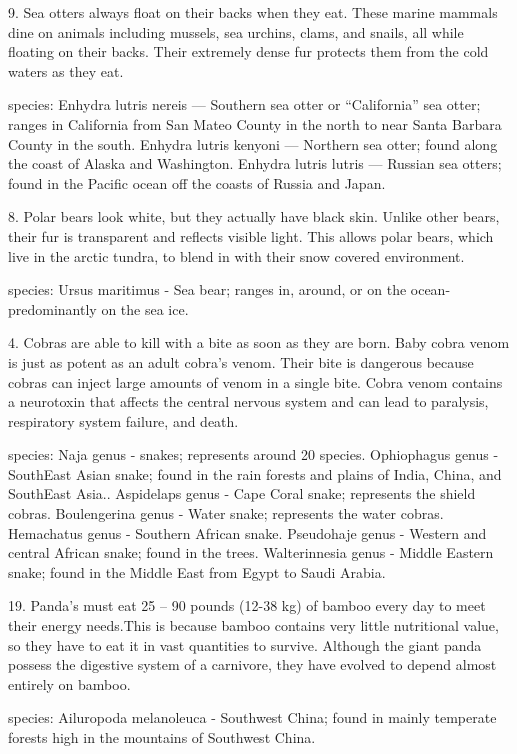 9. Sea otters always float on their backs when they eat. These marine mammals dine on animals including mussels, sea urchins, clams, and snails, all while floating on their backs. Their extremely dense fur protects them from the cold waters as they eat.

species:
Enhydra lutris nereis — Southern sea otter or “California” sea otter; ranges in California from San Mateo County in the north to near Santa Barbara County in the south.
Enhydra lutris kenyoni — Northern sea otter; found along the coast of Alaska and Washington.
Enhydra lutris lutris — Russian sea otters; found in the Pacific ocean off the coasts of Russia and Japan.

8. Polar bears look white, but they actually have black skin. Unlike other bears, their fur is transparent and reflects visible light. This allows polar bears, which live in the arctic tundra, to blend in with their snow covered environment.

species:
Ursus maritimus - Sea bear; ranges in, around, or on the ocean-predominantly on the sea ice.

4. Cobras are able to kill with a bite as soon as they are born. Baby cobra venom is just as potent as an adult cobra's venom. Their bite is dangerous because cobras can inject large amounts of venom in a single bite. Cobra venom contains a neurotoxin that affects the central nervous system and can lead to paralysis, respiratory system failure, and death.

species:
Naja genus - snakes; represents around 20 species.
Ophiophagus genus - SouthEast Asian snake; found in the rain forests and plains of India, China, and SouthEast Asia..
Aspidelaps genus - Cape Coral snake; represents the shield cobras.
Boulengerina genus - Water snake; represents the water cobras.
Hemachatus genus - Southern African snake.
Pseudohaje genus - Western and central African snake; found in the trees.
Walterinnesia genus - Middle Eastern snake; found in the Middle East from Egypt to Saudi Arabia.

19. Panda’s must eat 25 – 90 pounds (12-38 kg) of bamboo every day to meet their energy needs.This is because bamboo contains very little nutritional value, so they have to eat it in vast quantities to survive. Although the giant panda possess the digestive system of a carnivore, they have evolved to depend almost entirely on bamboo.

species:
Ailuropoda melanoleuca - Southwest China; found in mainly temperate forests high in the mountains of Southwest China.

